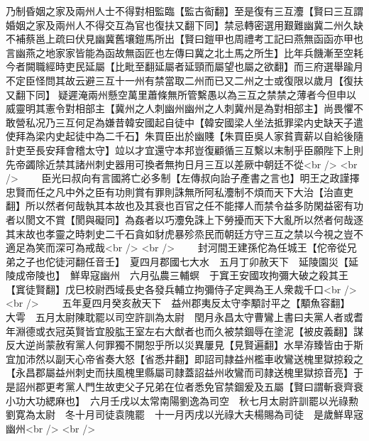 乃制昏姻之家及兩州人士不得對相監臨【監古䘖翻】至是復有三互灋【賢曰三互謂婚姻之家及兩州人不得交互為官也復扶又翻下同】禁忌轉密選用艱難幽冀二州久缺不補蔡邕上疏曰伏見幽冀舊壤鎧馬所出【賢曰鎧甲也周禮考工記曰燕無函函亦甲也言幽燕之地家家皆能為函故無函匠也左傳曰冀之北土馬之所生】比年兵饑漸至空耗今者闕職經時吏民延屬【比毗至翻延屬者延頸而屬望也屬之欲翻】而三府選舉踰月不定臣怪問其故云避三互十一州有禁當取二州而已又二州之士或復限以歲月【復扶又翻下同】疑遲淹兩州懸空萬里蕭條無所管繫愚以為三互之禁禁之薄者今但申以威靈明其憲令對相部主【冀州之人刺幽州幽州之人刺冀州是為對相部主】尚畏懼不敢營私况乃三互何足為嫌昔韓安國起自徒中【韓安國梁人坐法抵罪梁内史缺天子遣使拜為梁内史起徒中為二千石】朱買臣出於幽賤【朱買臣吳人家貧賣薪以自給後隨計吏至長安拜會稽太守】竝以才宜還守本邦豈復顧循三互繫以末制乎臣願陛下上則先帝蠲除近禁其諸州刺史器用可換者無拘日月三互以差厥中朝廷不從<br />
<br />
　　臣光曰叔向有言國將亡必多制【左傳叔向詒子產書之言也】明王之政謹擇忠賢而任之凡中外之臣有功則賞有罪則誅無所阿私灋制不煩而天下大治【治直吏翻】所以然者何哉執其本故也及其衰也百官之任不能擇人而禁令益多防閑益密有功者以閡文不賞【閡與礙同】為姦者以巧灋免誅上下勞擾而天下大亂所以然者何哉逐其末故也孝靈之時刺史二千石貪如豺虎暴殄烝民而朝廷方守三互之禁以今視之豈不適足為笑而深可為戒哉<br />
<br />
　　封河間王建孫佗為任城王【佗帝從兄弟之子也佗徒河翻任音壬】　夏四月郡國七大水　五月丁卯赦天下　延陵園災【延陵成帝陵也】　鮮卑寇幽州　六月弘農三輔螟　于窴王安國攻拘彌大破之殺其王【窴徒賢翻】戊巳校尉西域長史各發兵輔立拘彌侍子定興為王人衆裁千口<br />
<br />
　　五年夏四月癸亥赦天下　益州郡夷反太守李顒討平之【顒魚容翻】　大雩　五月太尉陳耽罷以司空許訓為太尉　閏月永昌太守曹鸞上書曰夫黨人者或耆年淵德或衣冠英賢皆宜股肱王室左右大猷者也而久被禁錮辱在塗泥【被皮義翻】謀反大逆尚蒙赦宥黨人何罪獨不開恕乎所以災異屢見【見賢遍翻】水旱洊臻皆由于斯宜加沛然以副天心帝省奏大怒【省悉井翻】即詔司隷益州檻車收鸞送槐里獄掠殺之【永昌郡屬益州刺史而扶風槐里縣屬司隷蓋詔益州收鸞而司隷送槐里獄掠音亮】于是詔州郡更考黨人門生故吏父子兄弟在位者悉免官禁錮爰及五屬【賢曰謂斬衰齊衰小功大功緦麻也】　六月壬戌以太常南陽劉逸為司空　秋七月太尉許訓罷以光祿勲劉寛為太尉　冬十月司徒袁隗罷　十一月丙戌以光祿大夫楊賜為司徒　是歲鮮卑宼幽州<br />
<br />
